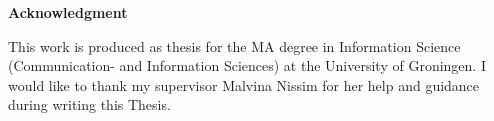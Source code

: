 \thispagestyle{plain}
\begin{center}
    \Large
    \textbf{Acknowledgment}
\end{center}
This work is produced as thesis for the MA degree in Information Science (Communication- and Information Sciences) at the University of Groningen. I would like to thank my supervisor Malvina Nissim for her help and guidance during writing this Thesis.

\clearpage
